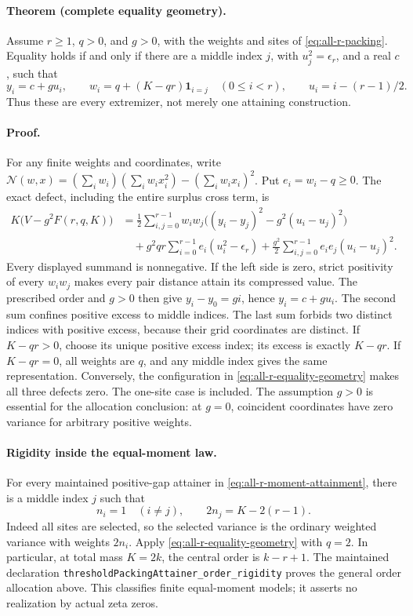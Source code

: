 \paragraph{Theorem (complete equality geometry).}
Assume \(r\ge1\), \(q>0\), and \(g>0\), with the weights and sites
of \eqref{eq:all-r-packing}. Equality holds if and only if there are
a middle index \(j\), with \(u_j^2=\epsilon_r\), and a real \(c\), such that
\begin{equation}
 y_i=c+gu_i,\qquad
 w_i=q+(K-qr)\mathbf1_{i=j}\quad(0\le i<r),
 \qquad u_i=i-(r-1)/2.
 \tag{RP5}\label{eq:all-r-equality-geometry}
\end{equation}
Thus these are every extremizer, not merely one attaining construction.

\paragraph{Proof.}
For any finite weights and coordinates, write
\(\mathcal N(w,x)=(\sum_iw_i)(\sum_iw_ix_i^2)-(\sum_iw_ix_i)^2\).
Put \(e_i=w_i-q\ge0\). The exact defect, including the entire
surplus cross term, is
\[
\begin{split}
 K\bigl(V-g^2F(r,q,K)\bigr)
 &=\frac12\sum_{i,j=0}^{r-1}w_iw_j
       \bigl((y_i-y_j)^2-g^2(u_i-u_j)^2\bigr)\\
 &\quad+g^2qr\sum_{i=0}^{r-1}e_i(u_i^2-\epsilon_r)
       +\frac{g^2}{2}\sum_{i,j=0}^{r-1}e_ie_j(u_i-u_j)^2 .
\end{split}
\]
Every displayed summand is nonnegative. If the left side is zero,
strict positivity of every \(w_iw_j\) makes every pair distance attain
its compressed value. The prescribed order and \(g>0\) then give
\(y_i-y_0=gi\), hence \(y_i=c+gu_i\).
The second sum confines positive excess to middle indices.
The last sum forbids two distinct indices with positive excess,
because their grid coordinates are distinct. If \(K-qr>0\),
choose its unique positive excess index; its excess is exactly \(K-qr\).
If \(K-qr=0\), all weights are \(q\), and any middle index gives the
same representation. Conversely, the configuration in
\eqref{eq:all-r-equality-geometry} makes all three defects zero.
The one-site case is included. The assumption \(g>0\) is essential
for the allocation conclusion: at \(g=0\), coincident coordinates
have zero variance for arbitrary positive weights.

\paragraph{Rigidity inside the equal-moment law.}
For every maintained positive-gap attainer in
\eqref{eq:all-r-moment-attainment}, there is a middle index \(j\) such that
\[
 n_i=1\quad(i\ne j),\qquad
 2n_j=K-2(r-1).
\]
Indeed all sites are selected, so the selected variance is the ordinary
weighted variance with weights \(2n_i\). Apply
\eqref{eq:all-r-equality-geometry} with \(q=2\).
In particular, at total mass \(K=2k\), the central order is \(k-r+1\).
The maintained declaration
\texttt{thresholdPackingAttainer\_order\_rigidity} proves the general
order allocation above. This classifies finite equal-moment models;
it asserts no realization by actual zeta zeros.


